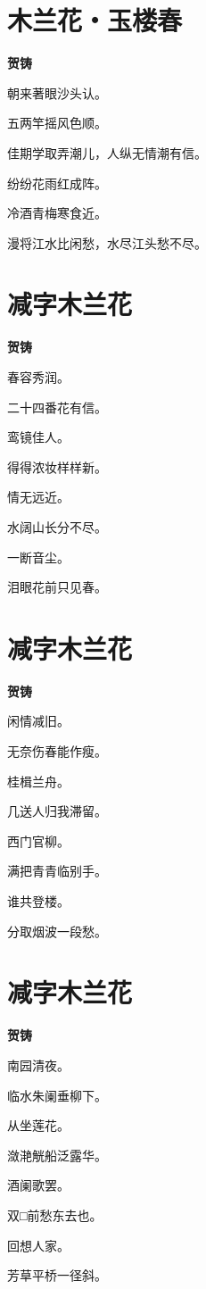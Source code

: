 \documentclass[12pt,a4paper]{ctexbook}
\begin{document}
\section{木兰花・玉楼春}
\textbf{贺铸}\par\vspace{0.5em}
朝来著眼沙头认。\par
五两竿摇风色顺。\par
佳期学取弄潮儿，人纵无情潮有信。\par
纷纷花雨红成阵。\par
冷酒青梅寒食近。\par
漫将江水比闲愁，水尽江头愁不尽。\par

\section{减字木兰花}
\textbf{贺铸}\par\vspace{0.5em}
春容秀润。\par
二十四番花有信。\par
鸾镜佳人。\par
得得浓妆样样新。\par
情无远近。\par
水阔山长分不尽。\par
一断音尘。\par
泪眼花前只见春。\par

\section{减字木兰花}
\textbf{贺铸}\par\vspace{0.5em}
闲情减旧。\par
无奈伤春能作瘦。\par
桂楫兰舟。\par
几送人归我滞留。\par
西门官柳。\par
满把青青临别手。\par
谁共登楼。\par
分取烟波一段愁。\par

\section{减字木兰花}
\textbf{贺铸}\par\vspace{0.5em}
南园清夜。\par
临水朱阑垂柳下。\par
从坐莲花。\par
潋滟觥船泛露华。\par
酒阑歌罢。\par
双□前愁东去也。\par
回想人家。\par
芳草平桥一径斜。\par
\end{document}
